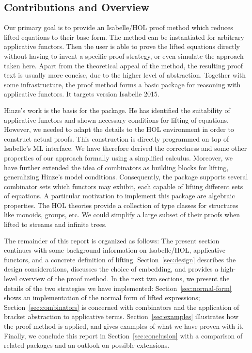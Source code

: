 \subsection{Contributions and Overview}\label{subsec:contrib-overview}

Our primary goal is to provide an Isabelle/HOL proof method which reduces
lifted equations to their base form.
The method can be instantiated for arbitrary applicative functors.
Then the user is able to prove the lifted equations directly without having to
invent a specific proof strategy, or even simulate the approach taken here.
Apart from the theoretical appeal of the method, the resulting proof text is
usually more concise, due to the higher level of abstraction.
Together with some infrastructure, the proof method forms a basic package
for reasoning with applicative functors.
It targets version Isabelle 2015.

Hinze's work is the basis for the package.
He has identified the suitability of applicative functors and shown
necessary conditions for lifting of equations.
However, we needed to adapt the details to the HOL environment in order to
construct actual proofs.
This construction is directly programmed on top of Isabelle's ML interface.
We have therefore derived the correctness and some other properties of our
approach formally using a simplified calculus.
Moreover, we have further extended the idea of combinators as building blocks
for lifting, generalizing Hinze's model conditions.
Consequently, the package supports several combinator sets which functors may
exhibit, each capable of lifting different sets of equations.
A particular motivation to implement this package are algebraic properties.
The HOL theories provide a collection of type classes for structures like
monoids, groups, etc.
We could simplify a large subset of their proofs when lifted to streams
and infinite trees.

The remainder of this report is organized as follows:
The present section continues with some background information on Isabelle/HOL,
applicative functors, and a concrete definition of lifting.
Section~\ref{sec:design} describes the design considerations, discusses the
choice of embedding, and provides a high-level overview of the proof method.
In the next two sections, we present the details of the two strategies we
have implemented:
Section~\ref{sec:normal-form} shows an implementation of the normal form of
lifted expressions;
Section~\ref{sec:combinators} is concerned with combinators and the application
of bracket abstraction to applicative terms.
Section~\ref{sec:examples} illustrates how the proof method is applied, and
gives examples of what we have proven with it.
Finally, we conclude this report in Section~\ref{sec:conclusion} with a
comparison of related packages and an outlook on possible extensions.


